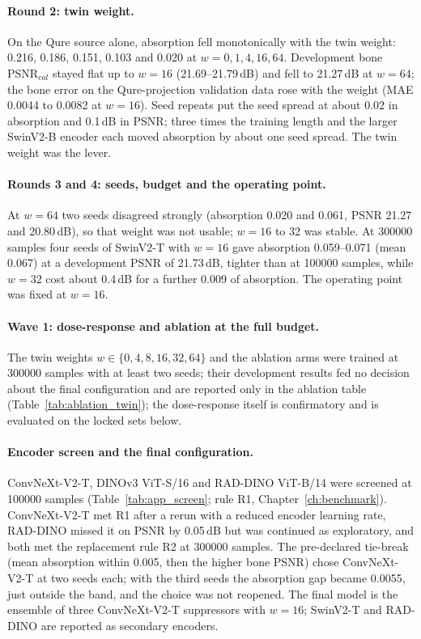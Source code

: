 \paragraph{Round 2: twin weight.} On the Qure source alone, absorption fell monotonically with the twin weight: 0.216, 0.186, 0.151, 0.103 and
0.020 at $w=0,1,4,16,64$. Development bone PSNR$_{cal}$ stayed flat up to $w=16$ (21.69--21.79\,dB) and fell to 21.27\,dB at $w=64$; the bone
error on the Qure-projection validation data rose with the weight (MAE 0.0044 to 0.0082 at $w=16$). Seed repeats put the seed spread at about
0.02 in absorption and 0.1\,dB in PSNR; three times the training length and the larger SwinV2-B encoder each moved absorption by about one
seed spread. The twin weight was the lever.

\paragraph{Rounds 3 and 4: seeds, budget and the operating point.} At $w=64$ two seeds disagreed strongly (absorption 0.020 and 0.061,
PSNR 21.27 and 20.80\,dB), so that weight was not usable; $w=16$ to 32 was stable. At \num{300000} samples four seeds of SwinV2-T with
$w=16$ gave absorption 0.059--0.071 (mean 0.067) at a development PSNR of 21.73\,dB, tighter than at \num{100000} samples, while $w=32$ cost
about 0.4\,dB for a further 0.009 of absorption. The operating point was fixed at $w=16$.

\paragraph{Wave 1: dose-response and ablation at the full budget.} The twin weights $w\in\{0,4,8,16,32,64\}$ and the ablation arms were
trained at \num{300000} samples with at least two seeds; their development results fed no decision about the final configuration and are
reported only in the ablation table (Table~\ref{tab:ablation_twin}); the dose-response itself is confirmatory and is evaluated on the locked
sets below.

\paragraph{Encoder screen and the final configuration.} ConvNeXt-V2-T, DINOv3 ViT-S/16 and RAD-DINO ViT-B/14 were screened at
\num{100000} samples (Table~\ref{tab:app_screen}; rule R1, Chapter~\ref{ch:benchmark}). ConvNeXt-V2-T met R1 after a rerun with a reduced
encoder learning rate, RAD-DINO missed it on PSNR by 0.05\,dB but was continued as exploratory, and both met the replacement rule R2 at
\num{300000} samples. The pre-declared tie-break (mean absorption within 0.005, then the higher bone PSNR) chose ConvNeXt-V2-T at two seeds
each; with the third seeds the absorption gap became 0.0055, just outside the band, and the choice was not reopened. The final model is the
ensemble of three ConvNeXt-V2-T suppressors with $w=16$; SwinV2-T and RAD-DINO are reported as secondary encoders.

